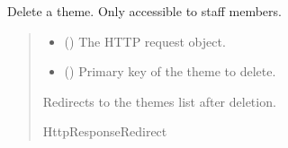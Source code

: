 \documentclass[letterpaper,10pt,english]{sphinxmanual}
\begin{document}
\begin{fulllineitems}
\label{\detokenize{courses:courses.views.delete_theme}}
\pysigstartsignatures
\pysiglinewithargsret
{}
{\sphinxparamcomma {}}
{}
\pysigstopsignatures
\sphinxAtStartPar
Delete a theme. Only accessible to staff members.
\begin{quote}\begin{description}
\begin{itemize}
\item {} 
\sphinxAtStartPar
{} () \textendash{} The HTTP request object.

\item {} 
\sphinxAtStartPar
{} () \textendash{} Primary key of the theme to delete.

\end{itemize}

\sphinxAtStartPar
Redirects to the themes list after deletion.

\sphinxAtStartPar
HttpResponseRedirect

\end{description}\end{quote}

\end{fulllineitems}

\end{document}
